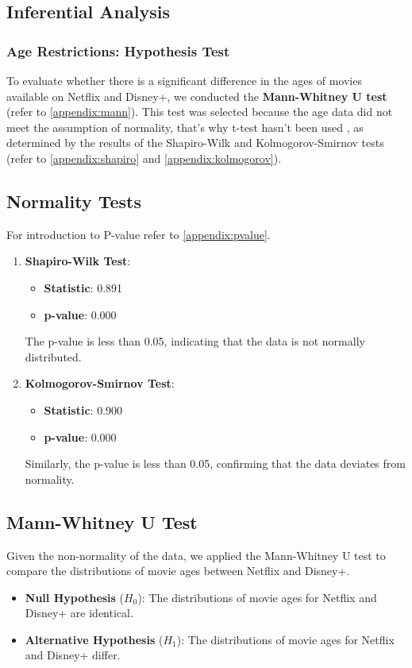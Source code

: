 \documentclass[a4paper, 12pt]{article}
\begin{document}
\subsection{Inferential Analysis}
\subsubsection{Age Restrictions: Hypothesis Test}

To evaluate whether there is a significant difference in the ages of movies available on Netflix and Disney+, we conducted the \textbf{Mann-Whitney U test} (refer to \autoref{appendix:mann}). This test was selected because the age data did not meet the assumption of normality, that's why t-test hasn't been used \cite{student1908}, as determined by the results of the Shapiro-Wilk and Kolmogorov-Smirnov tests (refer to \autoref{appendix:shapiro} and \autoref{appendix:kolmogorov}). 

\subsection*{Normality Tests}
For introduction to P-value refer to \autoref{appendix:pvalue}.
\begin{enumerate}
    \item \textbf{Shapiro-Wilk Test}:
    \begin{itemize}
        \item \textbf{Statistic}: 0.891
        \item \textbf{p-value}: 0.000
    \end{itemize}
    The p-value is less than 0.05, indicating that the data is not normally distributed.

    \item \textbf{Kolmogorov-Smirnov Test}:
    \begin{itemize}
        \item \textbf{Statistic}: 0.900
        \item \textbf{p-value}: 0.000
    \end{itemize}
    Similarly, the p-value is less than 0.05, confirming that the data deviates from normality.
\end{enumerate}

\subsection*{Mann-Whitney U Test}
Given the non-normality of the data, we applied the Mann-Whitney U test to compare the distributions of movie ages between Netflix and Disney+.
\begin{itemize}
    \item \textbf{Null Hypothesis} (\(H_0\)): The distributions of movie ages for Netflix and Disney+ are identical.
    \item \textbf{Alternative Hypothesis} (\(H_1\)): The distributions of movie ages for Netflix and Disney+ differ.
\end{itemize}
\end{document}
